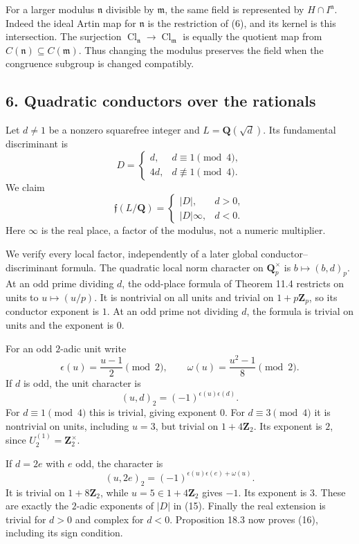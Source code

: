\documentclass[11pt,a4paper]{article}
\begin{document}
For a larger modulus \(\mathfrak n\) divisible by \(\mathfrak m\), the
same field is represented by \(H\cap I^{\mathfrak n}\). Indeed the ideal
Artin map for \(\mathfrak n\) is the restriction of (6), and its kernel
is this intersection. The surjection
\(\operatorname{Cl}_{\mathfrak n}\to\operatorname{Cl}_{\mathfrak m}\) is
equally the quotient map from
\(C(\mathfrak n)\subseteq C(\mathfrak m)\). Thus changing the modulus
preserves the field when the congruence subgroup is changed compatibly.

\subsection{6. Quadratic conductors over the
rationals}\label{quadratic-conductors-over-the-rationals}

Let \(d\ne1\) be a nonzero squarefree integer and
\(L=\mathbf Q(\sqrt d)\). Its fundamental discriminant is \[
D=\begin{cases}d,&d\equiv1\pmod4,\\4d,&d\not\equiv1\pmod4.\end{cases}
\tag{15}
\] We claim \[
\mathfrak f(L/\mathbf Q)=
\begin{cases}
|D|,&d>0,\\
|D|\infty,&d<0.
\end{cases}
\tag{16}
\] Here \(\infty\) is the real place, a factor of the modulus, not a
numeric multiplier.

We verify every local factor, independently of a later global
conductor--discriminant formula. The quadratic local norm character on
\(\mathbf Q_p^\times\) is \(b\mapsto(b,d)_p\). At an odd prime dividing
\(d\), the odd-place formula of Theorem 11.4 restricts on units to
\(u\mapsto(u/p)\). It is nontrivial on all units and trivial on
\(1+p\mathbf Z_p\), so its conductor exponent is \(1\). At an odd prime
not dividing \(d\), the formula is trivial on units and the exponent is
\(0\).

For an odd \(2\)-adic unit write \[
\epsilon(u)=\frac{u-1}{2}\pmod2,
\qquad\omega(u)=\frac{u^2-1}{8}\pmod2.
\] If \(d\) is odd, the unit character is \[
(u,d)_2=(-1)^{\epsilon(u)\epsilon(d)}.
\tag{17}
\] For \(d\equiv1\pmod4\) this is trivial, giving exponent \(0\). For
\(d\equiv3\pmod4\) it is nontrivial on units, including \(u=3\), but
trivial on \(1+4\mathbf Z_2\). Its exponent is \(2\), since
\(U_2^{(1)}=\mathbf Z_2^\times\).

If \(d=2e\) with \(e\) odd, the character is \[
(u,2e)_2=(-1)^{\epsilon(u)\epsilon(e)+\omega(u)}.
\tag{18}
\] It is trivial on \(1+8\mathbf Z_2\), while \(u=5\in1+4\mathbf Z_2\)
gives \(-1\). Its exponent is \(3\). These are exactly the \(2\)-adic
exponents of \(|D|\) in (15). Finally the real extension is trivial for
\(d>0\) and complex for \(d<0\). Proposition 18.3 now proves (16),
including its sign condition.
\end{document}

